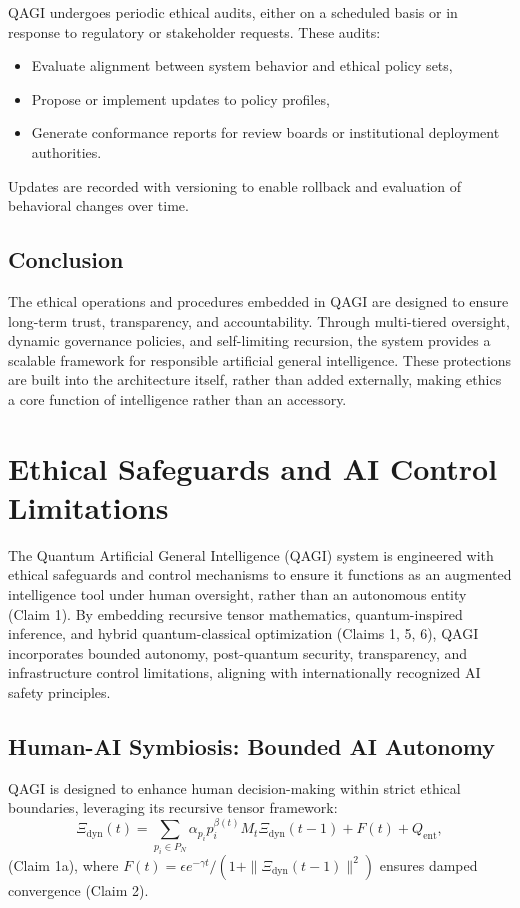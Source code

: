 \documentclass{article}
\theoremstyle{plain}
\theoremstyle{claimstyle}
\begin{document}
QAGI undergoes periodic ethical audits, either on a scheduled basis or in response to regulatory or stakeholder requests. These audits:
\begin{itemize}
    \item Evaluate alignment between system behavior and ethical policy sets,
    \item Propose or implement updates to policy profiles,
    \item Generate conformance reports for review boards or institutional deployment authorities.
\end{itemize}

Updates are recorded with versioning to enable rollback and evaluation of behavioral changes over time.

\subsection{Conclusion}

The ethical operations and procedures embedded in QAGI are designed to ensure long-term trust, transparency, and accountability. Through multi-tiered oversight, dynamic governance policies, and self-limiting recursion, the system provides a scalable framework for responsible artificial general intelligence. These protections are built into the architecture itself, rather than added externally, making ethics a core function of intelligence rather than an accessory.

\section{Ethical Safeguards and AI Control Limitations}

The Quantum Artificial General Intelligence (QAGI) system is engineered with ethical safeguards and control mechanisms to ensure it functions as an augmented intelligence tool under human oversight, rather than an autonomous entity (Claim 1). By embedding recursive tensor mathematics, quantum-inspired inference, and hybrid quantum-classical optimization (Claims 1, 5, 6), QAGI incorporates bounded autonomy, post-quantum security, transparency, and infrastructure control limitations, aligning with internationally recognized AI safety principles.

\subsection{Human-AI Symbiosis: Bounded AI Autonomy}
QAGI is designed to enhance human decision-making within strict ethical boundaries, leveraging its recursive tensor framework:
\begin{equation}
\Xi_{\text{dyn}}(t) = \sum_{p_i \in P_N} \alpha_{p_i} p_i^{\beta(t)} M_t \Xi_{\text{dyn}}(t-1) + F(t) + Q_{\text{ent}},
\end{equation}
(Claim 1a), where \( F(t) = \epsilon e^{-\gamma t} / (1 + \|\Xi_{\text{dyn}}(t-1)\|^2) \) ensures damped convergence (Claim 2).
\end{document}
